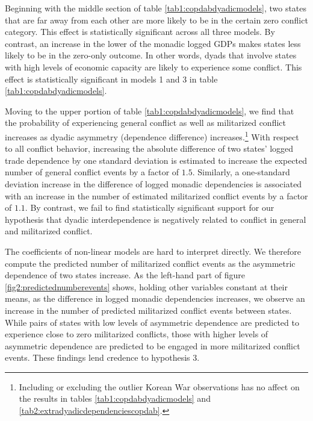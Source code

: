 \documentclass[12pt]{article}
\theoremstyle{hypothesis}
\begin{document}


Beginning with the middle section of table \ref{tab1:copdabdyadicmodels}, two states that are far away from each other are more likely to be in the certain zero conflict category. This effect is statistically significant across all three models. By contrast, an increase in the lower of the monadic logged GDPs makes states less likely to be in the zero-only outcome. In other words, dyads that involve states with high levels of economic capacity are likely to experience some conflict. This effect is statistically significant in models 1 and 3 in table \ref{tab1:copdabdyadicmodels}.

Moving to the upper portion of table \ref{tab1:copdabdyadicmodels}, we find that the probability of experiencing general conflict as well as militarized conflict increases as dyadic asymmetry (dependence difference) increases.\footnote{Including or excluding the outlier Korean War observations has no affect on the results in tables \ref{tab1:copdabdyadicmodels} and \ref{tab2:extradyadicdependenciescopdab}.} With respect to all conflict behavior, increasing the absolute difference of two states' logged trade dependence by one standard deviation is estimated to increase the expected number of general conflict events by a factor of $1.5$. Similarly, a one-standard deviation increase in the difference of logged monadic dependencies is associated with an increase in the number of estimated militarized conflict events by a factor of $1.1$. By contrast, we fail to find statistically significant support for our hypothesis that dyadic interdependence is negatively related to conflict in general and militarized conflict.

The coefficients of non-linear models are hard to interpret directly. We therefore compute the predicted number of militarized conflict events as the asymmetric dependence of two states increase. As the left-hand part of figure \ref{fig2:predictednumberevents} shows, holding other variables constant at their means, as the difference in logged monadic dependencies increases, we observe an increase in the number of predicted militarized conflict events between states. While pairs of states with low levels of asymmetric dependence are predicted to experience close to zero militarized conflicts, those with higher levels of asymmetric dependence are predicted to be engaged in more militarized conflict events. These findings lend credence to hypothesis 3.
\end{document}
